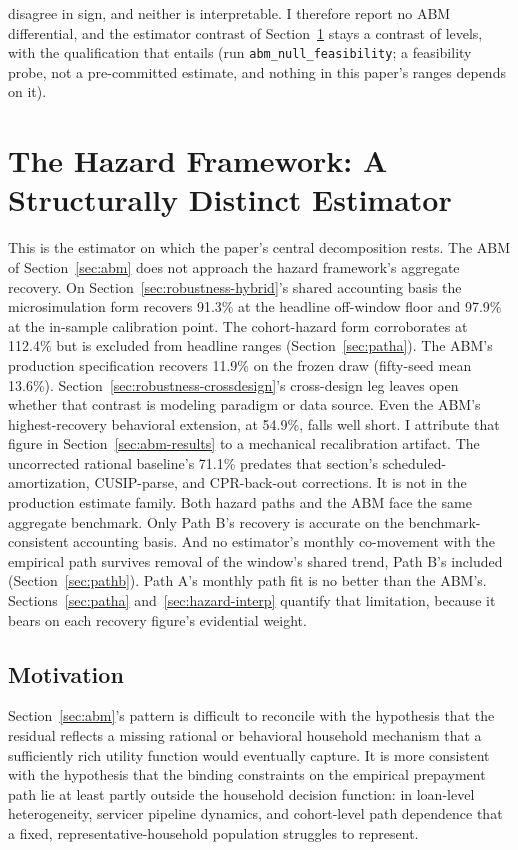\documentclass[12pt]{article}
\begin{document}
disagree in sign, and neither is interpretable. I therefore report no ABM differential, and the estimator contrast of Section~\ref{sec:hazard} stays a contrast of levels, with the qualification that entails (run \texttt{abm\_null\_feasibility}; a feasibility probe, not a pre-committed estimate, and nothing in this paper's ranges depends on it).
\section{The Hazard Framework: A Structurally Distinct Estimator}\label{sec:hazard}

This is the estimator on which the paper's central decomposition rests. The ABM of Section~\ref{sec:abm} does not approach the hazard framework's aggregate recovery. On Section~\ref{sec:robustness-hybrid}'s shared accounting basis the microsimulation form recovers 91.3\% at the headline off-window floor and 97.9\% at the in-sample calibration point. The cohort-hazard form corroborates at 112.4\% but is excluded from headline ranges (Section~\ref{sec:patha}). The ABM's production specification recovers 11.9\% on the frozen draw (fifty-seed mean 13.6\%). Section~\ref{sec:robustness-crossdesign}'s cross-design leg leaves open whether that contrast is modeling paradigm or data source. Even the ABM's highest-recovery behavioral extension, at 54.9\%, falls well short. I attribute that figure in Section~\ref{sec:abm-results} to a mechanical recalibration artifact. The uncorrected rational baseline's 71.1\% predates that section's scheduled-amortization, CUSIP-parse, and CPR-back-out corrections. It is not in the production estimate family. Both hazard paths and the ABM face the same aggregate benchmark. Only Path B's recovery is accurate on the benchmark-consistent accounting basis. And no estimator's monthly co-movement with the empirical path survives removal of the window's shared trend, Path B's included (Section~\ref{sec:pathb}). Path A's monthly path fit is no better than the ABM's. Sections~\ref{sec:patha} and~\ref{sec:hazard-interp} quantify that limitation, because it bears on each recovery figure's evidential weight.

\subsection{Motivation}\label{sec:hazard-motivation}

Section~\ref{sec:abm}'s pattern is difficult to reconcile with the hypothesis that the residual reflects a missing rational or behavioral household mechanism that a sufficiently rich utility function would eventually capture. It is more consistent with the hypothesis that the binding constraints on the empirical prepayment path lie at least partly outside the household decision function: in loan-level heterogeneity, servicer pipeline dynamics, and cohort-level path dependence that a fixed, representative-household population struggles to represent.
\end{document}
